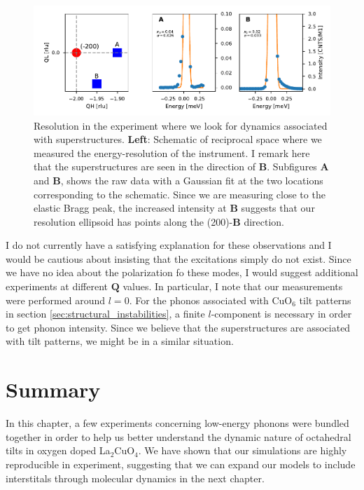 \begin{figure}
    \centering
    \includegraphics[width=\textwidth]{fig/lowen/resolution_phasons.pdf}
    \caption{Resolution in the experiment where we look for dynamics associated with superstructures. \textbf{Left}: Schematic of reciprocal space where we measured the energy-resolution of the instrument. I remark here that the superstructures are seen in the direction of \textbf{B}. Subfigures \textbf{A} and \textbf{B}, shows the raw data with a Gaussian fit at the two locations corresponding to the schematic. Since we are measuring close to the elastic Bragg peak, the increased intensity at \textbf{B} suggests that our resolution ellipsoid has points along the (200)-\textbf{B} direction.}
    \label{fig:phason_resolution}
\end{figure}

I do not currently have a satisfying explanation for these observations and I would be cautious about insisting that the excitations simply do not exist. Since we have no idea about the polarization fo these modes, I would suggest additional experiments at different $\bm{Q}$ values. In particular, I note that our measurements were performed around $l=0$. For the phonos associated with CuO$_6$ tilt patterns in section \ref{sec:structural_instabilities}, a finite $l$-component is necessary in order to get phonon intensity. Since we believe that the superstructures are associated with tilt patterns, we might be in a similar situation.

\section{Summary}
In this chapter, a few experiments concerning low-energy phonons were bundled together in order to help us better understand the dynamic nature of octahedral tilts in oxygen doped La$_2$CuO$_4$. We have shown that our simulations are highly reproducible in experiment, suggesting that we can expand our models to include interstitals through molecular dynamics in the next chapter. 

